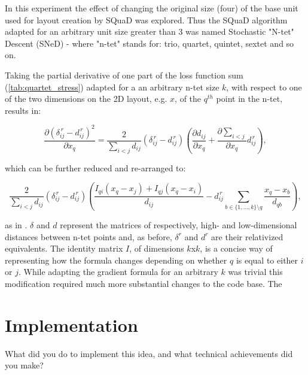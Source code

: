 \documentclass{l4proj}
\begin{document}
{In this experiment the effect of changing the original size  (four) of the base unit used for layout creation by SQuaD was explored. Thus the SQuaD algorithm adapted for an arbitrary unit size greater than 3 was named Stochastic "N-tet" Descent (SNeD) - where "n-tet" stands for: trio, quartet, quintet, sextet and so on.  

Taking the partial derivative of one part of the loss function sum (\ref{tab:quartet_stress}) adapted for a an arbitrary n-tet size $k$, with respect to one of the two dimensions on the 2D layout, e.g. $x$, of the $q^{th}$ point in the n-tet, results in: 

\begin{equation}
\label{tab:adapted quartet stress}
    \frac{\partial (\delta_{ij}^{\,r} - d_{ij}^{\,r})^2}{\partial x_q} = \frac{2}{\sum_{i<j}d_{ij}}(\delta_{ij}^{\,r} - d_{ij}^{\,r})\left(\frac{\partial d_{ij}}{\partial x_q} +  \frac{\partial \sum_{i<j}}{\partial x_q}d_{ij}^{\,r}\right), 
\end{equation}

\begin{center} which can be further reduced and re-arranged to: \end{center}

\begin{equation}
\label{tab:adapted quartet stress expanded}
     \frac{2}{\sum_{i<j}d_{ij}}(\delta_{ij}^{\,r} - d_{ij}^{\,r}) \left(\frac{I_{qi}(x_q - x_j) + I_{qj}(x_q - x_i)}{d_{ij}}  -  d_{ij}^{\,r} \sum_{b\in\{1,...,k\}\setminus q} \frac{x_q - x_b}{d_{qb}} \right), 
\end{equation} 

as in \citet{squad}. $\delta$ and $d$ represent the matrices of respectively, high- and low-dimensional distances between n-tet points and, as before,  $\delta^{r}$ and $d^{r}$ are their relativized equivalents. The identity matrix $I$, of dimensions $k$x$k$, is a concise way of representing how the formula changes depending on whether $q$ is equal to either $i$ or $j$. While adapting the gradient formula for an arbitrary $k$ was trivial this modification required much more substantial changes to the code base. The




\chapter{Implementation}
What did you do to implement this idea, and what technical achievements did you make?
}
\end{document}
